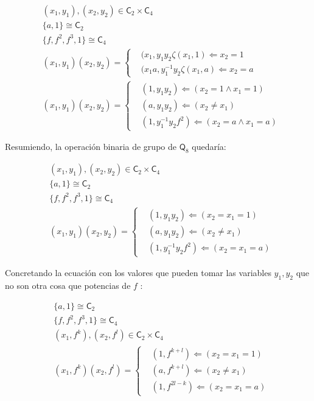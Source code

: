 \documentclass[12pt,a4paper,fleqn,spanish,final,openright]{extbook}
\theoremstyle{definition}
\theoremstyle{remark}
\begin{document}
\begin{align*}
&(x_1,y_1),(x_2,y_2)   \in \mathsf{C}_{2}   \times   \mathsf{C}_{4}\\
&\{a,1\}   \cong   \mathsf{C}_{2}\\
&\{f,f^2,f^3,1\}   \cong   \mathsf{C}_{4}\\
&(x_1,y_1) (x_2,y_2)=
\begin{cases}
&(x_1,y_1 y_2 \zeta (x_1,1)    \Leftarrow    x_2 = 1\\
&(x_1 a,y_1^{-1} y_2 \zeta (x_1,a)    \Leftarrow    x_2 = a
\end{cases}
\\
&(x_1,y_1) (x_2,y_2)=
\begin{cases}
&(1,y_1 y_2)    \Leftarrow    \left(x_2 = 1    \wedge    x_1 = 1\right)\\
&(a,y_1 y_2)    \Leftarrow    \left(x_2    \neq    x_1 \right)\\
&(1,y_1^{-1} y_2 f^2)    \Leftarrow    \left(x_2 = a    \wedge    x_1 = a\right)
\end{cases}
\end{align*}

	Resumiendo, la operación binaria de grupo de $\mathsf{Q}_{8}$ quedaría:

\begin{align*}
&(x_1,y_1),(x_2,y_2)   \in \mathsf{C}_{2}   \times   \mathsf{C}_{4}\\
&\{a,1\}   \cong   \mathsf{C}_{2}\\
&\{f,f^2,f^3,1\}   \cong   \mathsf{C}_{4}\\
&(x_1,y_1) (x_2,y_2)=
\begin{cases}
&(1,y_1 y_2 )    \Leftarrow    \left(x_2 = x_1 = 1\right)\\
&(a,y_1 y_2 )    \Leftarrow    \left(x_2   \neq    x_1\right)\\
&(1,y_1^{-1} y_2 f^2)    \Leftarrow    \left(x_2 = x_1 = a\right)
\end{cases}
\end{align*}

	Concretando la ecuación con los valores que pueden tomar las variables $y_1 , y_2$ que no son otra cosa que potencias de $f$ :

\begin{align*}
&\{a,1\}   \cong   \mathsf{C}_{2}\\
&\{f,f^2,f^3,1\}   \cong   \mathsf{C}_{4}\\
&(x_1,f^k),(x_2,f^l)   \in \mathsf{C}_{2}   \times   \mathsf{C}_{4}\\
&(x_1,f^k) (x_2,f^l)=
\begin{cases}
&(1,f^{k+l})    \Leftarrow    \left(x_2 = x_1 = 1\right)\\
&(a,f^{k+l})    \Leftarrow    \left(x_2    \neq    x_1 \right)\\
&(1,f^{2l-k})    \Leftarrow    \left(x_2 = x_1 = a\right)
\end{cases}
\end{align*}
\end{document}
